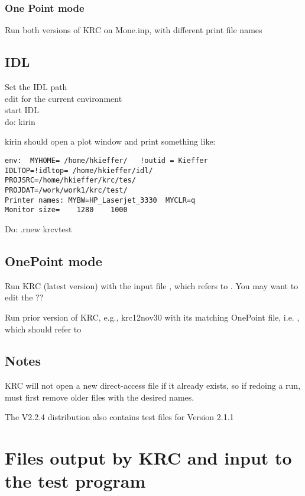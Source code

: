 \documentclass{article}  %
\begin{document}
\subsubsection{One Point mode} %

Run both versions of KRC on Mone.inp, with different print file names

\subsection{IDL} 
Set the IDL path
\\ edit  for the current environment
\\ start IDL
\\ do:  kirin

kirin should open a plot window and print something like:
\vspace{-3.mm} 
\begin{verbatim}
env:  MYHOME= /home/hkieffer/   !outid = Kieffer
IDLTOP=!idltop= /home/hkieffer/idl/
PROJSRC=/home/hkieffer/krc/tes/
PROJDAT=/work/work1/krc/test/
Printer names: MYBW=HP_Laserjet_3330  MYCLR=q
Monitor size=    1280    1000
\end{verbatim}

Do: .rnew krcvtest

\subsection{OnePoint mode} %
Run KRC (latest version) with the input file , which refers to . You may want to edit the  ??

Run prior version of KRC, e.g.,  krc12nov30 with its matching OnePoint file, i.e.  , which should refer to  

\subsection{Notes} %

KRC will not open a new direct-access file if it already exists, so if redoing a run, must first remove older files with the desired names.

The V2.2.4 distribution also contains test files for Version 2.1.1
\section{Files output by KRC and input to the test program \label{finput}} %
\end{document}
